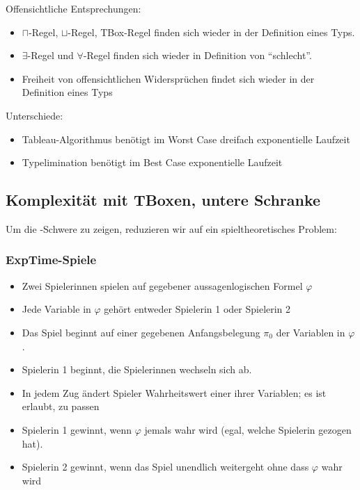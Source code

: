 Offensichtliche Entsprechungen:

\begin{itemize}
  \item $\sqcap$-Regel, $\sqcup$-Regel, TBox-Regel finden sich wieder in der Definition eines Typs.
  \item $\exists$-Regel und $\forall$-Regel finden sich wieder in Definition von \enquote{schlecht}.
  \item Freiheit von offensichtlichen Widersprüchen findet sich wieder in der Definition eines Typs
\end{itemize}

Unterschiede:

\begin{itemize}
  \item Tableau-Algorithmus benötigt im Worst Case dreifach exponentielle Laufzeit
  \item Typelimination benötigt im Best Case exponentielle Laufzeit
\end{itemize}

\subsection{Komplexität mit TBoxen, untere Schranke}\label{komplexituxe4t-mit-tboxen-untere-schranke}

Um die \ExpTime-Schwere zu zeigen, reduzieren wir auf ein spieltheoretisches Problem:

\subsubsection{ExpTime-Spiele}\label{exptime-spiele}

\begin{itemize}
\item Zwei Spielerinnen spielen auf gegebener aussagenlogischen Formel $\varphi$
\item Jede Variable in $\varphi$ gehört entweder Spielerin 1 oder Spielerin 2
\item Das Spiel beginnt auf einer gegebenen Anfangsbelegung $\pi_0$ der Variablen in $\varphi$.
\item Spielerin 1 beginnt, die Spielerinnen wechseln sich ab.
\item In jedem Zug ändert Spieler Wahrheitswert einer ihrer Variablen; es ist erlaubt, zu passen
\item Spielerin 1 gewinnt, wenn $\varphi$ jemals wahr wird (egal, welche Spielerin gezogen hat).
\item Spielerin 2 gewinnt, wenn das Spiel unendlich weitergeht ohne dass $\varphi$ wahr wird
\end{itemize}

